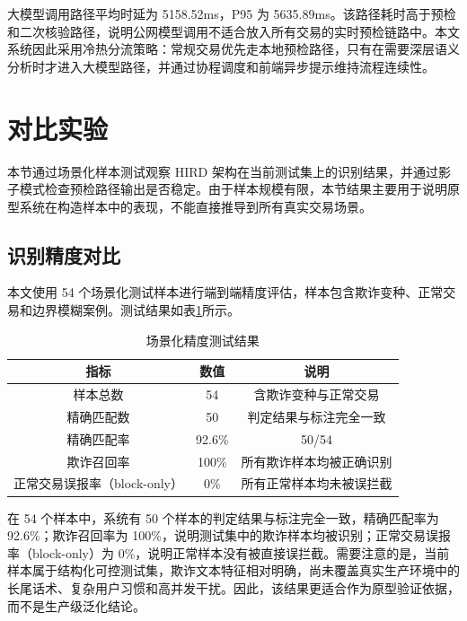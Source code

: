 \documentclass{xduugthesis}
\begin{document}
大模型调用路径平均时延为 5158.52ms，P95 为 5635.89ms。该路径耗时高于预检和二次核验路径，说明公网模型调用不适合放入所有交易的实时预检链路中。本文系统因此采用冷热分流策略：常规交易优先走本地预检路径，只有在需要深层语义分析时才进入大模型路径，并通过协程调度和前端异步提示维持流程连续性。

\section{对比实验}

本节通过场景化样本测试观察 HIRD 架构在当前测试集上的识别结果，并通过影子模式检查预检路径输出是否稳定。由于样本规模有限，本节结果主要用于说明原型系统在构造样本中的表现，不能直接推导到所有真实交易场景。

\subsection{识别精度对比}

本文使用 54 个场景化测试样本进行端到端精度评估，样本包含欺诈变种、正常交易和边界模糊案例。测试结果如表\ref{tab:scenario-accuracy}所示。

\begin{table}[H]
    \centering
    \caption{场景化精度测试结果}
    \label{tab:scenario-accuracy}
    \begin{tabular}{|c|c|c|}
        \hline
        指标 & 数值 & 说明 \\
        \hline
        样本总数 & 54 & 含欺诈变种与正常交易 \\
        \hline
        精确匹配数 & 50 & 判定结果与标注完全一致 \\
        \hline
        精确匹配率 & 92.6\% & 50/54 \\
        \hline
        欺诈召回率 & 100\% & 所有欺诈样本均被正确识别 \\
        \hline
        正常交易误报率（block-only） & 0\% & 所有正常样本均未被误拦截 \\
        \hline
    \end{tabular}
\end{table}

在 54 个样本中，系统有 50 个样本的判定结果与标注完全一致，精确匹配率为 92.6\%；欺诈召回率为 100\%，说明测试集中的欺诈样本均被识别；正常交易误报率（block-only）为 0\%，说明正常样本没有被直接误拦截。需要注意的是，当前样本属于结构化可控测试集，欺诈文本特征相对明确，尚未覆盖真实生产环境中的长尾话术、复杂用户习惯和高并发干扰。因此，该结果更适合作为原型验证依据，而不是生产级泛化结论。
\end{document}
